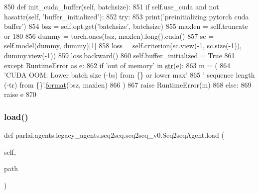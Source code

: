\begin{DoxyCode}
850     \textcolor{keyword}{def }init\_cuda\_buffer(self, batchsize):
851         \textcolor{keywordflow}{if} self.use\_cuda \textcolor{keywordflow}{and} \textcolor{keywordflow}{not} hasattr(self, \textcolor{stringliteral}{'buffer\_initialized'}):
852             \textcolor{keywordflow}{try}:
853                 print(\textcolor{stringliteral}{'preinitializing pytorch cuda buffer'})
854                 bsz = self.opt.get(\textcolor{stringliteral}{'batchsize'}, batchsize)
855                 maxlen = self.truncate \textcolor{keywordflow}{or} 180
856                 dummy = torch.ones(bsz, maxlen).long().cuda()
857                 sc = self.model(dummy, dummy)[1]
858                 loss = self.criterion(sc.view(-1, sc.size(-1)), dummy.view(-1))
859                 loss.backward()
860                 self.buffer\_initialized = \textcolor{keyword}{True}
861             \textcolor{keywordflow}{except} RuntimeError \textcolor{keyword}{as} e:
862                 \textcolor{keywordflow}{if} \textcolor{stringliteral}{'out of memory'} \textcolor{keywordflow}{in} \hyperlink{namespacegenerate__task__READMEs_a5b88452ffb87b78c8c85ececebafc09f}{str}(e):
863                     m = (
864                         \textcolor{stringliteral}{'CUDA OOM: Lower batch size (-bs) from \{\} or lower max'}
865                         \textcolor{stringliteral}{' sequence length (-tr) from \{\}'}.\hyperlink{namespaceparlai_1_1chat__service_1_1services_1_1messenger_1_1shared__utils_a32e2e2022b824fbaf80c747160b52a76}{format}(bsz, maxlen)
866                     )
867                     \textcolor{keywordflow}{raise} RuntimeError(m)
868                 \textcolor{keywordflow}{else}:
869                     \textcolor{keywordflow}{raise} e
870 
\end{DoxyCode}
\mbox{\label{classparlai_1_1agents_1_1legacy__agents_1_1seq2seq_1_1seq2seq__v0_1_1Seq2seqAgent_a2aabe1e56b7b94f46875ae7f704f681f}} 
\subsubsection{\texorpdfstring{load()}{load()}}
{\footnotesize\ttfamily def parlai.\+agents.\+legacy\+\_\+agents.\+seq2seq.\+seq2seq\+\_\+v0.\+Seq2seq\+Agent.\+load (\begin{DoxyParamCaption}\item[{}]{self,  }\item[{}]{path }\end{DoxyParamCaption})}

